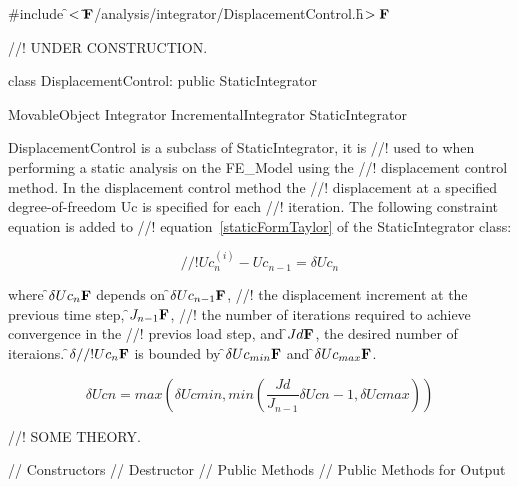 
\indent \#include \f$<\tilde{ }{\bf F}$/analysis/integrator/DisplacementControl.h\f$>{\bf F}$

//! UNDER CONSTRUCTION.

\indent class DisplacementControl: public StaticIntegrator

\indent MovableObject
\indent\indent Integrator
\indent\indent\indent IncrementalIntegrator
\indent\indent\indent\indent StaticIntegrator
\indent\indent\indent\indent{}

\indent DisplacementControl is a subclass of StaticIntegrator, it is
//! used to when performing a static analysis on the FE\_Model using the
//! displacement control method. In the displacement control method the
//! displacement at a specified degree-of-freedom Uc is specified for each
//! iteration. The following constraint equation is added to
//! equation~\ref{staticFormTaylor} of the StaticIntegrator class: 

\[ 
//! Uc_n^{(i)} - Uc_{n-1} = \delta Uc_n
\]

\noindent where \f$\delta Uc_n{\bf F}$ depends on \f$\delta Uc_{n-1}{\bf F}$,
//! the displacement increment at the previous time step, \f$J_{n-1}{\bf F}$,
//! the number of iterations required to achieve convergence in the
//! previos load step, and \f$Jd{\bf F}$, the desired number of iteraions. \f$\delta
//! Uc_n{\bf F}$ is bounded by \f$\delta Uc_{min}{\bf F}$  and \f$\delta Uc_{max}{\bf F}$.


\[ 
\delta Ucn = max \left( \delta Uc{min}, min \left(
\frac{Jd}{J_{n-1}} \delta Uc{n-1}, \delta Uc{max} \right) \right)
\]

//! SOME THEORY.

\indent // Constructors
\indent // Destructor
\indent // Public Methods
\indent // Public Methods for Output

